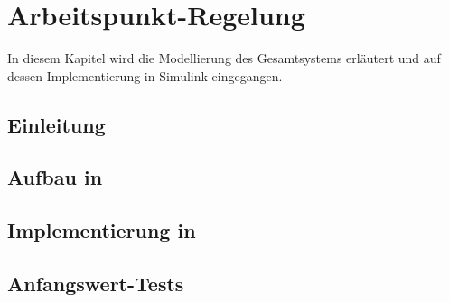 \chapter{Arbeitspunkt-Regelung}\label{cha:apr}

In diesem Kapitel wird die Modellierung des Gesamtsystems erläutert und auf dessen Implementierung in Simulink eingegangen.

\section{Einleitung}%



\section{Aufbau in \Simulink}



\section{Implementierung in \Matlab}



\section{Anfangswert-Tests}

